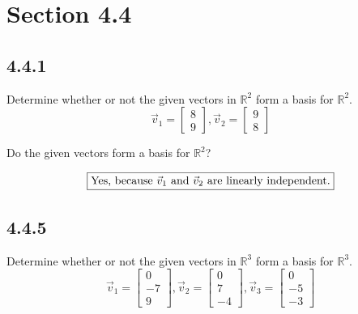 \documentclass{article}
\begin{document}
\newcommand{\hr}{\par\noindent\rule{\textwidth}{0.4pt}}

\newcommand{\bc}[1]{
	\begin{equation*}
		\begin{boxed}
			{#1}
		\end{boxed}
	\end{equation*}
}

\newcommand{\cond}[2]{
	\ifmmode
		{#1} \quad {#2}
	\else
		$$ {#1} \quad {#2} $$
	\fi
}

\newcommand{\matr}[1]{\mathbf{#1}}

\tableofcontents

\section{Section 4.4}

\subsection{4.4.1}

Determine whether or not the given vectors in $ \mathbb{R}^2 $ form a basis for $ \mathbb{R}^2 $.
\begin{equation*}
	\vec{v}_1 = \begin{bmatrix} 8 \\ 9 \end{bmatrix},
	\vec{v}_2 = \begin{bmatrix} 9 \\ 8 \end{bmatrix}
\end{equation*}

Do the given vectors form a basis for $ \mathbb{R}^2 $?
\bc{ \text{Yes, because } \vec{v}_1 \text{ and } \vec{v}_2 \text{ are linearly independent.} }

\subsection{4.4.5}

Determine whether or not the given vectors in $ \mathbb{R}^3 $ form a basis for $ \mathbb{R}^3 $.
\begin{equation*}
	\vec{v}_1 = \begin{bmatrix} 0 \\ -7 \\ 9 \end{bmatrix},
	\vec{v}_2 = \begin{bmatrix} 0 \\ 7 \\ -4 \end{bmatrix},
	\vec{v}_3 = \begin{bmatrix} 0 \\ -5 \\ -3 \end{bmatrix}
\end{equation*}
\end{document}
